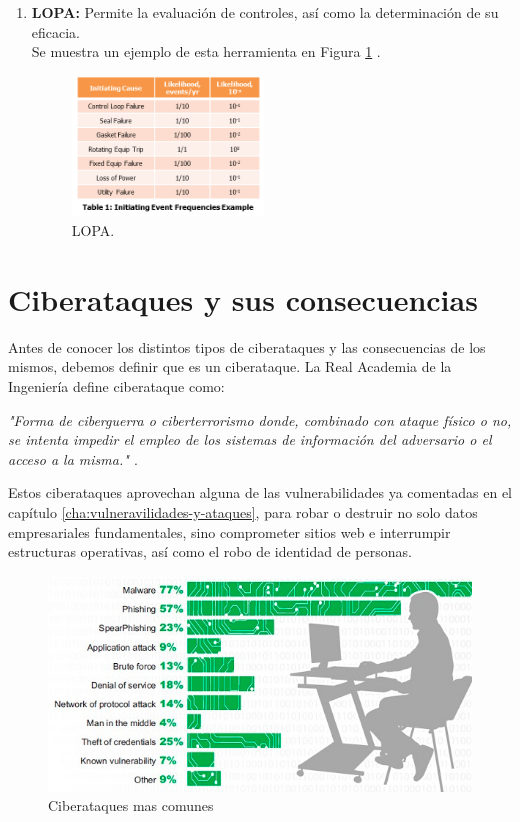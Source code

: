 \begin{enumerate}
\item {\bfseries LOPA:}
Permite la evaluación de controles, así como la determinación de su eficacia.\\
Se muestra un ejemplo de esta herramienta en Figura \ref{img:lopa} \cite{lopa}.
\begin{figure}[tphb]
  		   \centering
     		   \includegraphics[width=2in]{LOPA.png}
  		   \caption{LOPA.}
  		   \label{img:lopa}
\end{figure}

\end{enumerate}




\chapter{Ciberataques y sus consecuencias}
\label{cha:ciberataques-y-consecuencias}

Antes de conocer los distintos tipos de ciberataques y las consecuencias de los mismos, debemos definir que es un ciberataque. La Real Academia 
de la Ingeniería define ciberataque como:

\emph{"Forma de ciberguerra o ciberterrorismo donde, combinado con ataque físico o no, se intenta impedir el empleo de los sistemas de información 
del adversario o el acceso a la misma." \cite{ciberataque-rai}}.

Estos ciberataques aprovechan alguna de las vulnerabilidades ya comentadas en el capítulo \ref{cha:vulneravilidades-y-ataques}, para robar o destruir
no solo datos empresariales fundamentales, sino comprometer sitios web e interrumpir estructuras operativas, así como el robo de identidad de personas.

\begin{figure}[tphb]
  		   \centering
     		   \includegraphics[width=5in]{ciberataques.png}
  		   \caption{Ciberataques mas comunes \cite{ciberataques}}
  		   \label{img:ciberataques}
\end{figure}

